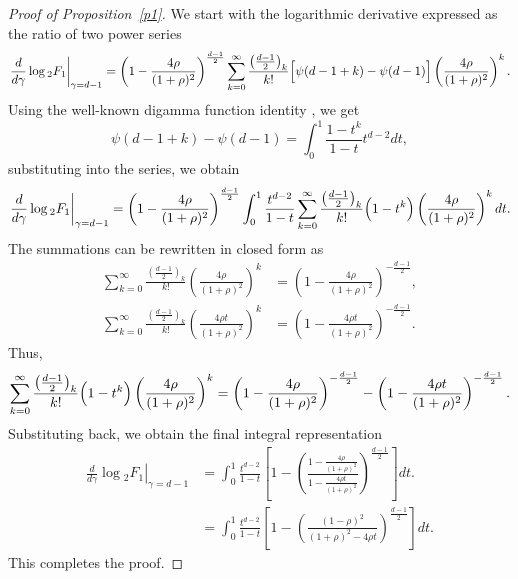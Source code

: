 \documentclass{article}
\begin{document}
\begin{proof}[Proof of Proposition~\ref{p1}]
We start with the logarithmic derivative expressed as the ratio of two power series
\begin{equation*}
    \left.\frac{d}{d\gamma}\log  {}_2F_1\right|_{\gamma=d-1}  = \left(1 - \frac{4\rho}{(1+\rho)^2}\right)^{\frac{d-1}{2}}
    \sum_{k=0}^\infty \frac{\left(\frac{d-1}{2}\right)_k}{k!} \Bigl[\psi(d-1+k)-\psi(d-1)\Bigr] \left(\frac{4\rho}{(1+\rho)^2}\right)^k.
\end{equation*}
Using the well-known digamma function identity \cite[5.9.16]{watson:DLMF}, we get
\begin{equation*}
    \psi(d-1+k) - \psi(d-1) = \int_0^1 \frac{1 - t^k}{1 - t} t^{d-2} dt,
\end{equation*}
substituting into the series, we obtain
\begin{equation*}
    \left.\frac{d}{d\gamma}\log {}_2F_1\right|_{\gamma=d-1} = \left(1 - \frac{4\rho}{(1+\rho)^2}\right)^{\frac{d-1}{2}} 
    \int_0^1 \frac{t^{d-2}}{1-t} \sum_{k=0}^\infty \frac{\left(\frac{d-1}{2}\right)_k}{k!} \Bigl(1 - t^k\Bigr) \left(\frac{4\rho}{(1+\rho)^2}\right)^k dt.
\end{equation*}
The summations can be rewritten in closed form as
\begin{align*}
    \sum_{k=0}^\infty \frac{\left(\frac{d-1}{2}\right)_k}{k!} \left(\frac{4\rho}{(1+\rho)^2}\right)^k &= \left(1 - \frac{4\rho}{(1+\rho)^2}\right)^{-\frac{d-1}{2}}, \\
    \sum_{k=0}^\infty \frac{\left(\frac{d-1}{2}\right)_k}{k!} \left(\frac{4\rho t}{(1+\rho)^2}\right)^k &= \left(1 - \frac{4\rho t}{(1+\rho)^2}\right)^{-\frac{d-1}{2}}.
\end{align*}
Thus, 
\begin{equation*}
    \sum_{k=0}^\infty \frac{\left(\frac{d-1}{2}\right)_k}{k!} \Bigl(1 - t^k\Bigr) \left(\frac{4\rho}{(1+\rho)^2}\right)^k
    = \left(1 - \frac{4\rho}{(1+\rho)^2}\right)^{-\frac{d-1}{2}}
    - \left(1 - \frac{4\rho t}{(1+\rho)^2}\right)^{-\frac{d-1}{2}}.
\end{equation*}
Substituting back, we obtain the final integral representation
\begin{align*}
    \left.\frac{d}{d\gamma}\log {}_2F_1\right|_{\gamma=d-1} &= \int_0^1 \frac{t^{d-2}}{1-t} \left[1 - \left(\frac{1 - \frac{4\rho}{(1+\rho)^2}}{1 - \frac{4\rho t}{(1+\rho)^2}}\right)^{\frac{d-1}{2}} \right] dt. \\
    &= \int_0^1 \frac{t^{d-2}}{1-t} \left[1 - \left(\frac{(1 -\rho)^2}{(1+\rho)^2 - 4 \rho t}\right)^{\frac{d-1}{2}} \right] dt.
\end{align*}
This completes the proof.
\end{proof}
\end{document}

